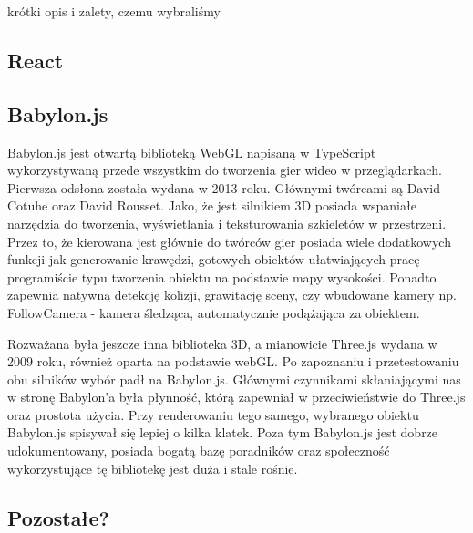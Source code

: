 \documentclass[11pt,a4paper,polish,thesis]{dcsbook}
\begin{document}
	krótki opis i zalety, czemu wybraliśmy
	
	\subsection{React}
	

	
	\subsection{Babylon.js}

	Babylon.js jest otwartą biblioteką WebGL napisaną w TypeScript wykorzystywaną przede wszystkim do tworzenia gier wideo w przeglądarkach. Pierwsza odsłona została wydana w 2013 roku. Głównymi twórcami są David Cotuhe oraz David Rousset. Jako, że jest silnikiem 3D posiada wspaniałe narzędzia do tworzenia, wyświetlania i teksturowania szkieletów w przestrzeni. Przez to, że kierowana jest głównie do twórców gier posiada wiele dodatkowych funkcji jak generowanie krawędzi, gotowych obiektów ułatwiających pracę programiście typu tworzenia obiektu na podstawie mapy wysokości. Ponadto zapewnia natywną detekcję kolizji, grawitację sceny, czy wbudowane kamery np. FollowCamera - kamera śledząca, automatycznie podążająca za obiektem. 
	
	Rozważana była jeszcze inna biblioteka 3D, a mianowicie Three.js wydana w 2009 roku, również oparta na podstawie webGL. Po zapoznaniu i przetestowaniu obu silników wybór padł na Babylon.js. Głównymi czynnikami skłaniającymi nas w stronę Babylon'a była płynność, którą zapewniał w przeciwieństwie do Three.js oraz prostota użycia. Przy renderowaniu tego samego, wybranego obiektu Babylon.js spisywał się lepiej o kilka klatek. Poza tym Babylon.js jest dobrze udokumentowany, posiada bogatą bazę poradników oraz społeczność wykorzystujące tę bibliotekę jest duża i stale rośnie.
	
	\subsection{Pozostałe?}
	
\end{document}
